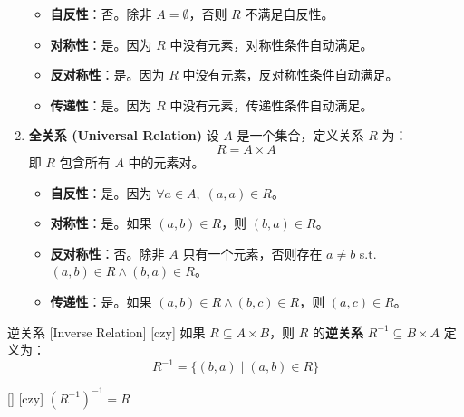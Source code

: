 \documentclass[UTF8]{ctexart}
\begin{document}
\begin{xmp}
\begin{enumerate}
                \begin{itemize}
                    \item \textbf{自反性}：否。除非 \( A = \emptyset \)，否则 \( R \) 不满足自反性。
                    \item \textbf{对称性}：是。因为 \( R \) 中没有元素，对称性条件自动满足。
                    \item \textbf{反对称性}：是。因为 \( R \) 中没有元素，反对称性条件自动满足。
                    \item \textbf{传递性}：是。因为 \( R \) 中没有元素，传递性条件自动满足。
                \end{itemize}
            \item \textbf{全关系 (Universal Relation)}
                设 \( A \) 是一个集合，定义关系 \( R \) 为：
                \[
                R = A \times A
                \]
                即 \( R \) 包含所有 \( A \) 中的元素对。
                
                \begin{itemize}
                    \item \textbf{自反性}：是。因为 \( \forall a \in A, \; (a, a) \in R \)。
                    \item \textbf{对称性}：是。如果 \( (a, b) \in R \)，则 \( (b, a) \in R \)。
                    \item \textbf{反对称性}：否。除非 \( A \) 只有一个元素，否则存在 \( a \neq b \) s.t. \( (a, b) \in R \land (b, a) \in R \)。
                    \item \textbf{传递性}：是。如果 \( (a, b) \in R \land (b, c) \in R \)，则 \( (a, c) \in R \)。
                \end{itemize}
            \end{enumerate}
        \end{xmp}
        
        \begin{dfn}
            [UUID]
            {逆关系}
            [Inverse Relation]
            [czy]
            如果 \( R \subseteq A \times B \)，则 \( R \) 的\textbf{逆关系} \( R^{-1} \subseteq B \times A \) 定义为：
            \[
            R^{-1} = \{ (b, a) \mid (a, b) \in R \}
            \]
        \end{dfn}

        \begin{ppt}
            [UUID]
            {}
            []
            [czy]
            \( (R^{-1})^{-1} = R \)
        \end{ppt}
\end{document}
